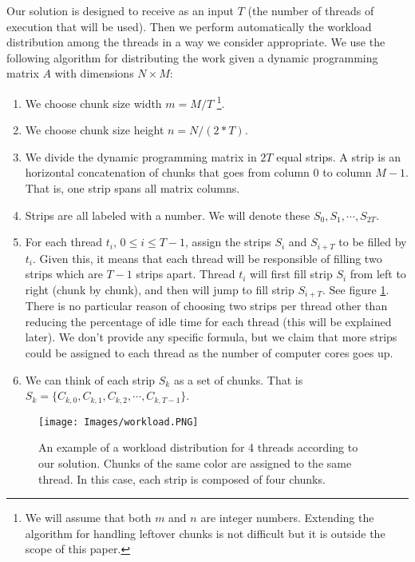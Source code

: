 \documentclass[journal]{IEEEtran}
\begin{document}
Our solution is designed to receive as an input $T$ (the number of threads of execution that will be used). Then we perform automatically the workload distribution among the threads in a way we consider appropriate. We use the following algorithm for distributing the work given a dynamic programming matrix $A$ with dimensions $N \times M$:

\begin{enumerate}
    \item We choose chunk size width $m = M / T$ \footnote{We will assume that both $m$ and $n$ are integer numbers. Extending the algorithm for handling leftover chunks is not difficult but it is outside the scope of this paper.}.
    \item We choose chunk size height $n = N / (2 * T)$.
    \item We divide the dynamic programming matrix in $2T$ equal strips. A strip is an horizontal concatenation of chunks that goes from column $0$ to column $M - 1$. That is, one strip spans all matrix columns.
    \item Strips are all labeled with a number. We will denote these $S_0, S_1, \cdots, S_{2T}$.
    \item For each thread $t_i$, $0 \leq i \leq T-1$, assign the strips $S_i$ and $S_{i + T}$ to be filled by $t_i$. Given this, it means that each thread will be responsible of filling two strips which are $T-1$ strips apart. Thread $t_i$ will first fill strip $S_i$ from left to right (chunk by chunk), and then will jump to fill strip $S_{i + T}$. See figure \ref{exec}. There is no particular reason of choosing two strips per thread other than reducing the percentage of idle time for each thread (this will be explained later). We don't provide any specific formula, but we claim that more strips could be assigned to each thread as the number of computer cores goes up.
    \item We can think of each strip $S_k$ as a set of chunks. That is $S_k = \{ C_{k, 0}, C_{k, 1}, C_{k,2}, \cdots, C_{k,T-1}\}$. 
\end{enumerate}

\begin{figure}[h]
  \begin{center}
    \texttt{[image: Images/workload.PNG]}
  \end{center}
  \caption{An example of a workload distribution for 4 threads according to our solution. Chunks of the same color are assigned to the same thread. In this case, each strip is composed of four chunks.}
  \label{exec}
\end{figure}
\end{document}
